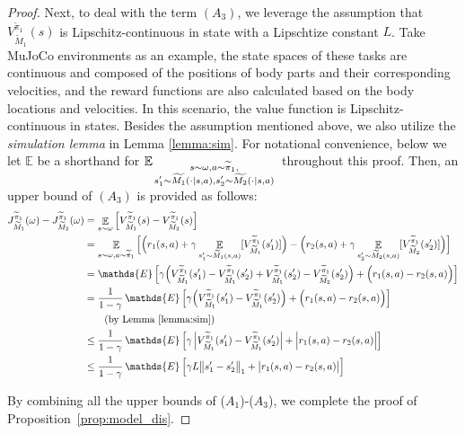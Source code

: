 \begin{proof}
Next, to deal with the term $(A_3)$, we leverage the assumption that ${V^{\widetilde{\pi}_1}_{\widetilde{M}_1}(s)}$ is Lipschitz-continuous in state with a Lipschtize constant $L$. Take MuJoCo environments as an example, the state spaces of these tasks are continuous and composed of the positions of body parts and their corresponding velocities, and the reward functions are also calculated based on the body locations and velocities. In this scenario,  the value function is Lipschitz-continuous in states. 
Besides the assumption mentioned above, we also utilize the \textit{simulation lemma} in Lemma \ref{lemma:sim}. For notational convenience, below we let $\mathbb{E}$ be a shorthand for $\displaystyle {\mathbb{E}}_{\scriptstyle s\sim\omega, a\sim\widetilde{\pi}_1, \atop \scriptstyle s'_1\sim \widetilde{M_1}(\cdot\rvert s,a), s'_2\sim \widetilde{M_2}(\cdot \rvert s,a)}$ throughout this proof. Then, an upper bound of $(A_3)$ is provided as follows:
\begin{align}
    J^{\widetilde{\pi}_1}_{\widetilde{M}_1}(\omega) - J^{\widetilde{\pi}_1}_{\widetilde{M}_2}(\omega)
    &= \displaystyle\mathop{\mathbb{E}}_{s\sim\omega} 
    {\left[ V^{\widetilde{\pi}_1}_{\widetilde{M}_1}(s) - V^{\widetilde{\pi}_1}_{\widetilde{M}_2}(s) \right]} \\
    &=\displaystyle\mathop{\mathbb{E}}_{s\sim\omega, a\sim\widetilde{\pi}_1} \Big[\Big(r_1(s,a)+ \gamma\displaystyle\mathop{\mathbb{E}}_{s'_1\sim \widetilde{M}_1(s,a)}[V^{\widetilde{\pi}_1}_{\widetilde{M}_1}(s'_1)]\Big) - \Big( r_2(s,a)+\gamma \displaystyle\mathop{\mathbb{E}}_{s'_2\sim \widetilde{M}_2(s,a)}[V^{\widetilde{\pi}_1}_{\widetilde{M}_2}(s'_2)] \Big)\Big] \\
    &= \mathop{\mathds{E}} \Big[\gamma \Big( V^{\widetilde{\pi}_1}_{\widetilde{M}_1}(s'_1)-V^{\widetilde{\pi}_1}_{\widetilde{M}_1}(s'_2)+V^{\widetilde{\pi}_1}_{\widetilde{M}_1}(s'_2)-V^{\widetilde{\pi}_1}_{\widetilde{M}_2}(s'_2) \Big) + \Big(r_1(s,a)-r_2(s,a)\Big) \Big]\\
    &= \frac{1}{1-\gamma} \displaystyle\mathop{\mathds{E}} {\left[ \gamma \Big(V^{\widetilde{\pi}_1}_{\widetilde{M}_1}(s'_1) - V^{\widetilde{\pi}_1}_{\widetilde{M}_1}(s'_2) \Big) + \Big(r_1(s,a)-r_2(s,a)\Big)\right]}\\
    & \tag*{\text{(by Lemma \ref{lemma:sim})}} \\
    &\le \frac{1}{1-\gamma}  \displaystyle\mathop{\mathds{E}} {\left[\gamma\left| V^{\widetilde{\pi}_1}_{\widetilde{M}_1}(s'_1) - V^{\widetilde{\pi}_1}_{\widetilde{M}_1}(s'_2)\right| + \Big| r_1(s,a)-r_2(s,a)\Big| \right]} \\
    &\le \frac{1}{1-\gamma}  \displaystyle\mathop{\mathds{E}} \Big[ \gamma L\norm\big{ s'_1 - s'_2}_1 + \big| r_1(s,a)-r_2(s,a)\big| \Big]
\end{align}

By combining all the upper bounds of ($A_1$)-($A_3$), we complete the proof of Proposition~\ref{prop:model_dis}.
\end{proof}

